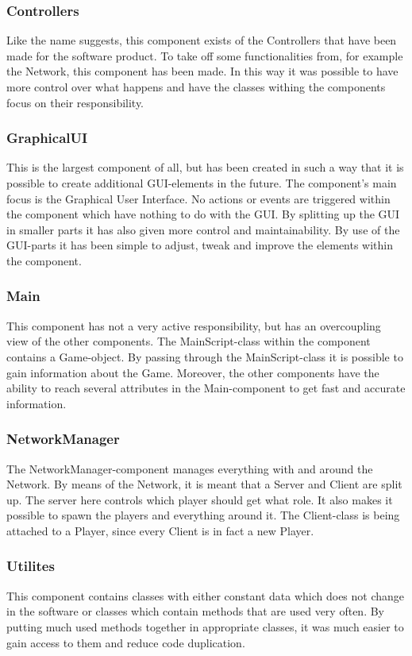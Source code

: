 \documentclass[11pt,twoside,a4paper]{article}
\begin{document}
\subsubsection{Controllers}
Like the name suggests, this component exists of the Controllers that have been made for the software product. To take off some functionalities from, for example the Network, this component has been made. In this way it was possible to have more control over what happens and have the classes withing the components focus on their responsibility.

\subsubsection{GraphicalUI}
This is the largest component of all, but has been created in such a way that it is possible to create additional GUI-elements in the future. The component's main focus is the Graphical User Interface. No actions or events are triggered within the component which have nothing to do with the GUI. By splitting up the GUI in smaller parts it has also given more control and maintainability. By use of the GUI-parts it has been simple to adjust, tweak and improve the elements within the component.

\subsubsection{Main}
This component has not a very active responsibility, but has an overcoupling view of the other components. The MainScript-class within the component contains a Game-object. By passing through the MainScript-class it is possible to gain information about the Game. Moreover, the other components have the ability to reach several attributes in the Main-component to get fast and accurate information.

\subsubsection{NetworkManager}
The NetworkManager-component manages everything with and around the Network. By means of the Network, it is meant that a Server and Client are split up. The server here controls which player should get what role. It also makes it possible to spawn the players and everything around it. The Client-class is being attached to a Player, since every Client is in fact a new Player. 

\subsubsection{Utilites}
This component contains classes with either constant data which does not change in the software or classes which contain methods that are used very often. By putting much used methods together in appropriate classes, it was much easier to gain access to them and reduce code duplication.
\end{document}
